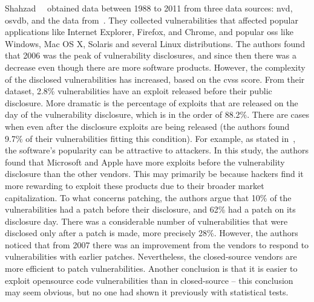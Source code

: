 Shahzad~\etal{}~\cite{Shahzad:2012} obtained data between 1988 to 2011 from three data sources: \gls{nvd}, \gls{osvdb}, and the data from~\cite{Frei:2006}. 
They collected vulnerabilities that affected popular applications like Internet Explorer, Firefox, and Chrome, and popular \glspl{os} like Windows, Mac OS X, Solaris and several Linux distributions. 
The authors found that 2006 was the peak of vulnerability disclosures, and since then there was a decrease even though there are more software products. 
However, the complexity of the disclosed vulnerabilities has increased, based on the \gls{cvss} score. 
From their dataset, 2.8\% vulnerabilities have an exploit released before their public disclosure. 
More dramatic is the percentage of exploits that are released on the day of the vulnerability disclosure, which is in the order of 88.2\%. 
There are cases when even after the disclosure exploits are being released (the authors found 9.7\% of their vulnerabilities fitting this condition). 
For example, as stated in~\cite{Gorbenko:2011}, the software’s popularity can be attractive to attackers. 
In this study, the authors found that Microsoft and Apple have more exploits before the vulnerability disclosure than the other vendors. 
This may primarily be because hackers find it more rewarding to exploit these products due to their broader market capitalization.
To what concerns patching, the authors argue that 10\% of the vulnerabilities had a patch before their disclosure, and 62\% had a patch on its disclosure day. 
There was a considerable number of vulnerabilities that were disclosed only after a patch is made, more precisely 28\%. 
However, the authors noticed that from 2007 there was an improvement from the vendors to respond to vulnerabilities with earlier patches. 
Nevertheless, the closed-source vendors are more efficient to patch vulnerabilities. 
Another conclusion is that it is easier to exploit opensource code vulnerabilities than in closed-source – this conclusion may seem obvious, but no one had shown it previously with statistical tests.


